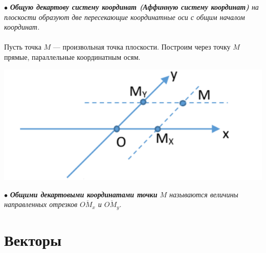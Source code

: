 $\bullet$ \textit{\textbf{Общую декартову систему координат (Аффинную систему координат)} на плоскости образуют две пересекающие координатные оси с общим началом координат.}\\\\
Пусть точка $M$ --- произвольная точка плоскости. Построим через точку $M$ прямые, параллельные координатным осям.\begin{center}
	\includegraphics[scale=0.3]{images/odsk.png}
\end{center}
$\bullet$ \textit{\textbf{Общими декартовыми координатами точки} $M$ называются величины направленных отрезков $\overline{OM_x}$ и $\overline{OM_y}$}.











\chapter{Векторы}
